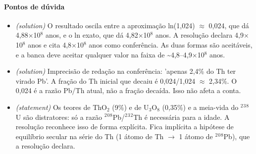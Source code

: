 \documentclass{article}%
\begin{document}
\paragraph{Pontos de dúvida}%
\begin{itemize}%
\item%
\textit{(solution)} O resultado oscila entre a aproximação ln(1,024) $\approx$ 0,024, que dá 4,88$\times$10$^{8}$ anos, e o ln exato, que dá 4,82$\times$10$^{8}$ anos. A resolução declara 4,9$\times$10$^{8}$ anos e cita 4,8$\times$10$^{8}$ anos como conferência. As duas formas são aceitáveis, e a banca deve aceitar qualquer valor na faixa de \textasciitilde{}4,8--4,9$\times$10$^{8}$ anos.%
\item%
\textit{(solution)} Imprecisão de redação na conferência: 'apenas 2,4\% do Th ter virado Pb'. A fração do Th inicial que decaiu é 0,024/1,024 $\approx$ 2,34\%. O 0,024 é a razão Pb/Th atual, não a fração decaída. Isso não afeta a conta.%
\item%
\textit{(statement)} Os teores de ThO$_{2}$ (9\%) e de U$_{3}$O$_{8}$ (0,35\%) e a meia{-}vida do $^2$$^3$$^{8}$U são distratores: só a razão $^2$$^{0}$$^{8}$Pb/$^2$$^3$$^2$Th é necessária para a idade. A resolução reconhece isso de forma explícita. Fica implícita a hipótese de equilíbrio secular na série do Th (1 átomo de Th $\to$ 1 átomo de $^2$$^{0}$$^{8}$Pb), que a resolução declara.%
\end{itemize}%
\end{document}

